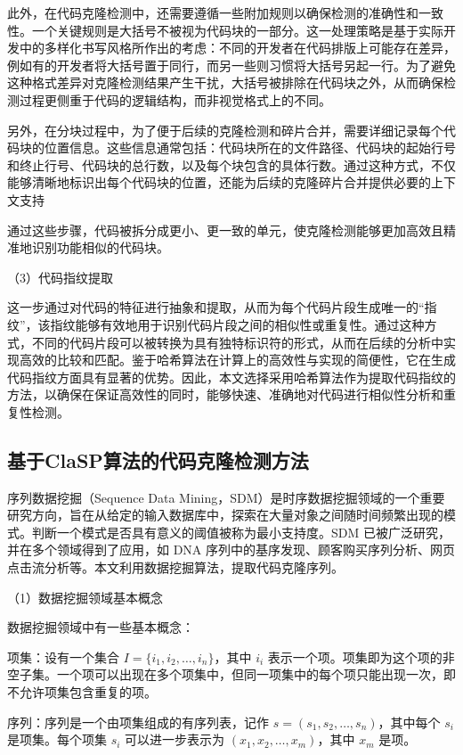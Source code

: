 此外，在代码克隆检测中，还需要遵循一些附加规则以确保检测的准确性和一致性。一个关键规则是大括号不被视为代码块的一部分。这一处理策略是基于实际开发中的多样化书写风格所作出的考虑：不同的开发者在代码排版上可能存在差异，例如有的开发者将大括号置于同行，而另一些则习惯将大括号另起一行。为了避免这种格式差异对克隆检测结果产生干扰，大括号被排除在代码块之外，从而确保检测过程更侧重于代码的逻辑结构，而非视觉格式上的不同。

另外，在分块过程中，为了便于后续的克隆检测和碎片合并，需要详细记录每个代码块的位置信息。这些信息通常包括：代码块所在的文件路径、代码块的起始行号和终止行号、代码块的总行数，以及每个块包含的具体行数。通过这种方式，不仅能够清晰地标识出每个代码块的位置，还能为后续的克隆碎片合并提供必要的上下文支持

通过这些步骤，代码被拆分成更小、更一致的单元，使克隆检测能够更加高效且精准地识别功能相似的代码块。

（3）代码指纹提取

这一步通过对代码的特征进行抽象和提取，从而为每个代码片段生成唯一的“指纹”，该指纹能够有效地用于识别代码片段之间的相似性或重复性。通过这种方式，不同的代码片段可以被转换为具有独特标识符的形式，从而在后续的分析中实现高效的比较和匹配。鉴于哈希算法在计算上的高效性与实现的简便性，它在生成代码指纹方面具有显著的优势。因此，本文选择采用哈希算法作为提取代码指纹的方法，以确保在保证高效性的同时，能够快速、准确地对代码进行相似性分析和重复性检测。


\subsection{基于ClaSP算法的代码克隆检测方法}
序列数据挖掘（Sequence Data Mining，SDM）是时序数据挖掘领域的一个重要研究方向，旨在从给定的输入数据库中，探索在大量对象之间随时间频繁出现的模式。判断一个模式是否具有意义的阈值被称为最小支持度。SDM 已被广泛研究，并在多个领域得到了应用，如 DNA 序列中的基序发现、顾客购买序列分析、网页点击流分析等。本文利用数据挖掘算法，提取代码克隆序列。

（1）数据挖掘领域基本概念

数据挖掘领域中有一些基本概念：

项集\cite{2013ClaSP}：设有一个集合 \( I = \{i_1, i_2, \dots, i_n\} \)，其中 \( i_i \) 表示一个项。项集即为这个项的非空子集。一个项可以出现在多个项集中，但同一项集中的每个项只能出现一次，即不允许项集包含重复的项。

序列\cite{2013ClaSP}：序列是一个由项集组成的有序列表，记作 \( s = (s_1, s_2, \dots, s_n) \)，其中每个 \( s_i \) 是项集。每个项集 \( s_i \) 可以进一步表示为 \( (x_1, x_2, \dots, x_m) \)，其中 \( x_m \) 是项。

